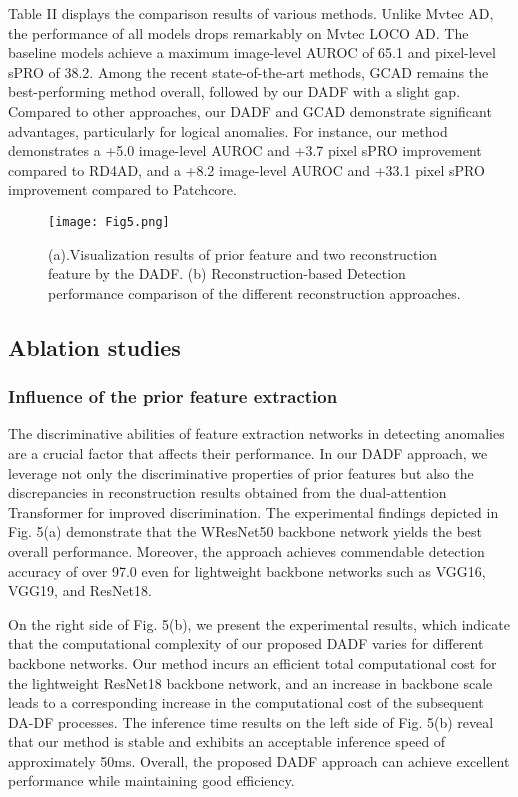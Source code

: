\documentclass[journal]{IEEEtran}
\begin{document}
Table II displays the comparison results of various methods. Unlike Mvtec AD, the performance of all models drops remarkably on Mvtec LOCO AD. The baseline models achieve a maximum image-level AUROC of 65.1 and pixel-level sPRO of 38.2. Among the recent state-of-the-art methods, GCAD remains the best-performing method overall, followed by our DADF with a slight gap. Compared to other approaches, our DADF and GCAD demonstrate significant advantages, particularly for logical anomalies. For instance, our method demonstrates a +5.0 image-level AUROC and +3.7 pixel sPRO improvement compared to RD4AD, and a +8.2 image-level AUROC and +33.1 pixel sPRO improvement compared to Patchcore.

\begin{figure}[t]
\centerline{\texttt{[image: Fig5.png]}}
\caption[width=8.8cm]{
(a).Visualization results of prior feature and two reconstruction feature by the DADF. (b) Reconstruction-based Detection performance comparison of the different reconstruction approaches. 
}



\label{fig1}
\end{figure}

\subsection{Ablation studies}

\subsubsection{Influence of the prior feature extraction}

The discriminative abilities of feature extraction networks in detecting anomalies are a crucial factor that affects their performance. In our DADF approach, we leverage not only the discriminative properties of prior features but also the discrepancies in reconstruction results obtained from the dual-attention Transformer for improved discrimination. The experimental findings depicted in Fig. 5(a) demonstrate that the WResNet50 backbone network yields the best overall performance. Moreover, the approach achieves commendable detection accuracy of over 97.0 even for lightweight backbone networks such as VGG16, VGG19, and ResNet18.

On the right side of Fig. 5(b), we present the experimental results, which indicate that the computational complexity of our proposed DADF varies for different backbone networks. Our method incurs an efficient total computational cost for the lightweight ResNet18 backbone network, and an increase in backbone scale leads to a corresponding increase in the computational cost of the subsequent DA-DF processes. The inference time results on the left side of Fig. 5(b) reveal that our method is stable and exhibits an acceptable inference speed of approximately 50ms. Overall, the proposed DADF approach can achieve excellent performance while maintaining good efficiency.
\end{document}
